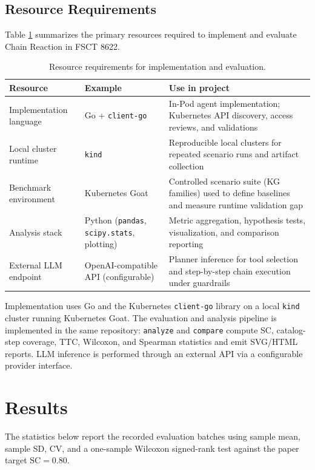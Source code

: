 \documentclass[conference]{IEEEtran}
\begin{document}
\subsection{Resource Requirements}
Table \ref{tab:resources} summarizes the primary resources required to implement and evaluate Chain Reaction in FSCT 8622.

\begin{table}[t!]
\centering
\caption{Resource requirements for implementation and evaluation.}
\label{tab:resources}
\scriptsize
\setlength{\tabcolsep}{6pt}
\renewcommand{\arraystretch}{1.2}
\begin{tabularx}{\textwidth}{l l X}
\toprule
\textbf{Resource} & \textbf{Example} & \textbf{Use in project} \\
\midrule
Implementation language & Go + \texttt{client-go} & In-Pod agent implementation; Kubernetes API discovery, access reviews, and validations \\
Local cluster runtime & \texttt{kind} & Reproducible local clusters for repeated scenario runs and artifact collection \\
Benchmark environment & Kubernetes Goat & Controlled scenario suite (KG families) used to define baselines and measure runtime validation gap \\
Analysis stack & Python (\texttt{pandas}, \texttt{scipy.stats}, plotting) & Metric aggregation, hypothesis tests, visualization, and comparison reporting \\
External LLM endpoint & OpenAI-compatible API (configurable) & Planner inference for tool selection and step-by-step chain execution under guardrails \\
\bottomrule
\end{tabularx}
\end{table}

Implementation uses Go and the Kubernetes \texttt{client-go} library on a local \texttt{kind} cluster running Kubernetes Goat. The evaluation and analysis pipeline is implemented in the same repository: \texttt{analyze} and \texttt{compare} compute SC, catalog-step coverage, TTC, Wilcoxon, and Spearman statistics and emit SVG/HTML reports. LLM inference is performed through an external API via a configurable provider interface.

\section{Results}

The statistics below report the recorded evaluation batches using sample mean, sample SD, CV, and a one-sample Wilcoxon signed-rank test against the paper target $\mathrm{SC}=0.80$.
\end{document}
